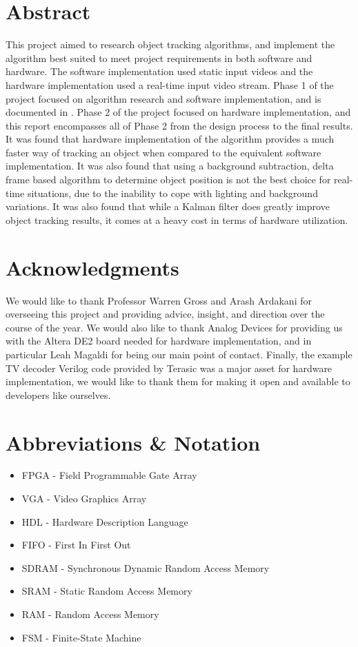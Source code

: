 \documentclass[11pt]{article} %
\begin{document}
\section*{Abstract}
This project aimed to research object tracking algorithms, and implement the algorithm best suited to meet project requirements in both software and hardware. The software implementation used static input videos and the hardware implementation used a real-time input video stream. Phase 1 of the project focused on algorithm research and software implementation, and is documented in \cite{phase1}. Phase 2 of the project focused on hardware implementation, and this report encompasses all of Phase 2 from the design process to the final results. It was found that hardware implementation of the algorithm provides a much faster way of tracking an object when compared to the equivalent software implementation. It was also found that using a background subtraction, delta frame based algorithm to determine object position is not the best choice for real-time situations, due to the inability to cope with lighting and background variations. It was also found that while a Kalman filter does greatly improve object tracking results, it comes at a heavy cost in terms of hardware utilization.
\section*{Acknowledgments}
We would like to thank Professor Warren Gross and Arash Ardakani for overseeing this project and providing advice, insight, and direction over the course of the year. We would also like to thank Analog Devices for providing us with the Altera DE2 board needed for hardware implementation, and in particular Leah Magaldi for being our main point of contact. Finally, the example TV decoder Verilog code provided by Terasic was a major asset for hardware implementation, we would like to thank them for making it open and available to developers like ourselves. 
\pagebreak
\tableofcontents
\pagebreak
\section{Abbreviations \& Notation}
\begin{itemize}
\item[] FPGA - Field Programmable Gate Array
\item[] VGA - Video Graphics Array
\item[] HDL - Hardware Description Language
\item[] FIFO - First In First Out
\item[] SDRAM - Synchronous Dynamic Random Access Memory
\item[] SRAM - Static Random Access Memory
\item[] RAM - Random Access Memory
\item[] FSM - Finite-State Machine
\end{itemize}
\end{document}

